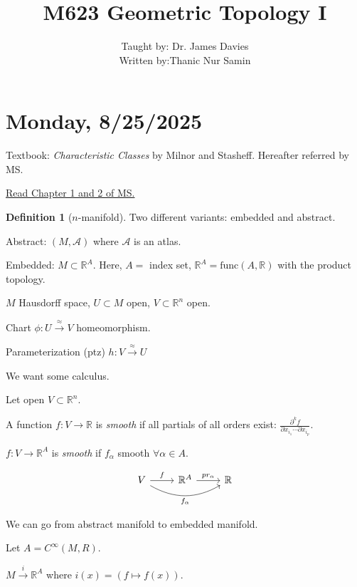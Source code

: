 \documentclass{article}
\title{M623 Geometric Topology I}
\author{Taught by: Dr. James Davies \\ Written by:Thanic Nur Samin}
\date{}
\theoremstyle{definition}
\newtheorem*{definition}{Definition}
\begin{document}
    \maketitle

    \section*{Monday, 8/25/2025}

    Textbook: \textit{Characteristic Classes} by Milnor and Stasheff. Hereafter referred by MS.

    \underline{Read Chapter 1 and 2 of MS.}

    \begin{definition}
        [\(n\)-manifold]

        Two different variants: embedded and abstract.

    

        Abstract: \((M, \mathcal{A})\) where \(\mathcal{A}\) is an atlas.
    \end{definition}

    Embedded: \(M \subset \mathbb{R}^A\). Here, \(A =\) index set, \(\mathbb{R}^A = \text{func}(A,\mathbb{R})\) with the product topology.

    \(M\) Hausdorff space, \(U \subset M\) open, \(V \subset \mathbb{R}^n\) open.
        
    Chart \(\phi : U \xrightarrow{\approx} V\) homeomorphism.

    Parameterization (ptz) \(h: V \xrightarrow{\approx} U\)

    We want some calculus.

    Let open \(V \subset \mathbb{R}^n\).

    A function \(f: V \to \mathbb{R}\) is \textit{smooth} if all partials of all orders exist: \(\frac{\partial^k f}{\partial x_{i_1} \cdots \partial x_{i_{p}}}\).

    \(f: V \to \mathbb{R}^A\) is \textit{smooth} if \(f_\alpha\) smooth \(\forall \alpha \in A\).

    \[
        \begin{tikzcd}
            V \ar[rr, bend right,"f_\alpha"'] \ar[r,"f"] & \mathbb{R}^A \ar[r,"pr_{\alpha}"] & \mathbb{R}
        \end{tikzcd}
    \]

    We can go from abstract manifold to embedded manifold.

    Let \(A = C^{\infty} (M,R)\).

    \(M \xrightarrow{i}\mathbb{R}^A\) where \(i(x) = (f \mapsto f(x))\).
\end{document}
